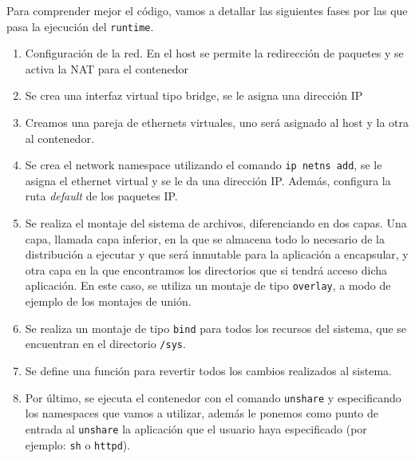\documentclass[a4paper, oneside, 12pt]{book}
\begin{document}
	\vspace{10px}

	\noindent Para comprender mejor el código, vamos a detallar las siguientes fases por las que pasa la ejecución del \texttt{runtime}.
	\begin{enumerate}
		\item Configuración de la red. En el host se permite la redirección de paquetes y se activa la NAT para el contenedor
		\item Se crea una interfaz virtual tipo bridge, se le asigna una dirección IP
		\item Creamos una pareja de ethernets virtuales, uno será asignado al host y la otra al contenedor.
		\item Se crea el network namespace utilizando el comando \texttt{ip netns add}, se le asigna el ethernet virtual y se le da una dirección IP. Además, configura la ruta \textit{default} de los paquetes IP.
		\item Se realiza el montaje del sistema de archivos, diferenciando en dos capas. Una capa, llamada capa inferior, en la que se almacena todo lo necesario de la distribución a ejecutar y que será inmutable para la aplicación a encapsular, y otra capa en la que encontramos los directorios que si tendrá acceso dicha aplicación. En este caso, se utiliza un montaje de tipo \texttt{overlay}, a modo de ejemplo de los montajes de unión.
		\item Se realiza un montaje de tipo \texttt{bind} para todos los recursos del sistema, que se encuentran en el directorio \texttt{/sys}.
		\item Se define una función para revertir todos los cambios realizados al sistema.
		\item Por último, se ejecuta el contenedor con el comando \texttt{unshare} y especificando los namespaces que vamos a utilizar, además le ponemos como punto de entrada al \texttt{unshare} la aplicación que el usuario haya especificado (por ejemplo: \texttt{sh} o \texttt{httpd}).
	\end{enumerate}

	\pagebreak
	
\end{document}
